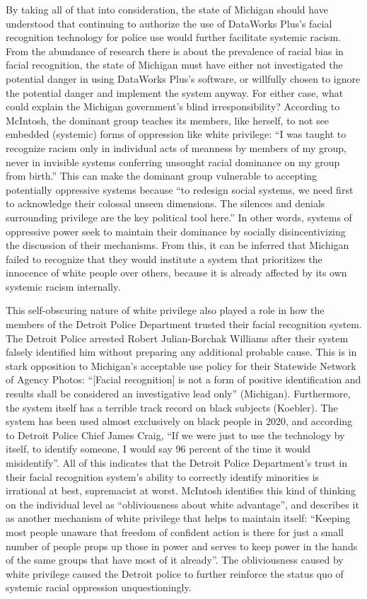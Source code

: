 \documentclass[12pt, letterpaper]{article}
\begin{document}
\begin{mla}
By taking all of that into consideration, the state of Michigan should have
understood that continuing to authorize the use of DataWorks Plus's facial
recognition technology for police use would further facilitate systemic
racism. From the abundance of research there is about the prevalence of racial
bias in facial recognition, the state of Michigan must have either not
investigated the potential danger in using DataWorks Plus's software, or
willfully chosen to ignore the potential danger and implement the system
anyway. For either case, what could explain the Michigan government's blind
irresponsibility? According to McIntosh, the dominant group teaches its
members, like herself, to not see embedded (systemic) forms of oppression like
white privilege: ``I was taught to recognize racism only in individual acts of
meanness by members of my group, never in invisible systems conferring
unsought racial dominance on my group from birth.'' This can make the dominant
group vulnerable to accepting potentially oppressive systems because ``to
redesign social systems, we need first to acknowledge their colossal unseen
dimensions. The silences and denials surrounding privilege are the key
political tool here.'' In other words, systems of oppressive power seek to
maintain their dominance by socially disincentivizing the discussion of their
mechanisms. From this, it can be inferred that Michigan failed to recognize
that they would institute a system that prioritizes the innocence of white
people over others, because it is already affected by its own systemic racism
internally.

This self-obscuring nature of white privilege also played a role in how the
members of the Detroit Police Department trusted their facial recognition
system. The Detroit Police arrested Robert Julian-Borchak Williams after their
system falsely identified him without preparing any additional probable cause.
This is in stark opposition to Michigan's acceptable use policy for their
Statewide Network of Agency Photos: ``[Facial recognition] is not a form of
positive identification and results shall be considered an investigative lead
only'' (Michigan). Furthermore, the system itself has a terrible track record
on black subjects (Koebler). The system has been used almost exclusively on
black people in 2020, and according to Detroit Police Chief James Craig, ``If
we were just to use the technology by itself, to identify someone, I would say
96 percent of the time it would misidentify''. All of this indicates that the
Detroit Police Department's trust in their facial recognition system's ability
to correctly identify minorities is irrational at best, supremacist at worst.
McIntosh identifies this kind of thinking on the individual level as
``obliviousness about white advantage'', and describes it as another mechanism
of white privilege that helps to maintain itself: ``Keeping most people
unaware that freedom of confident action is there for just a small number of
people props up those in power and serves to keep power in the hands of the
same groups that have most of it already''. The obliviousness caused by white
privilege caused the Detroit police to further reinforce the status quo of
systemic racial oppression unquestioningly.


\end{mla}
\end{document}
